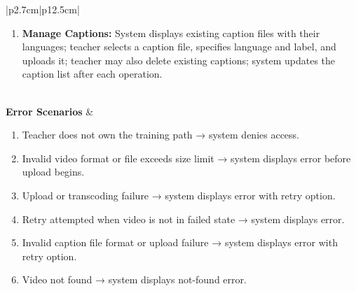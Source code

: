 \begin{table}[H]
\begin{tabular}{|p{2.7cm}|p{12.5cm}|}
\begin{minipage}[t]{\linewidth}
\begin{enumerate}[topsep=0pt,itemsep=1pt,parsep=0pt,partopsep=0pt]
                \item \textbf{Manage Captions:} System displays existing caption files with their languages; teacher selects a caption file, specifies language and label, and uploads it; teacher may also delete existing captions; system updates the caption list after each operation.
            \end{enumerate}
        \end{minipage} \\
        \hline
        \textbf{Error Scenarios} &
        \begin{minipage}[t]{\linewidth}
            \begin{enumerate}[topsep=0pt,itemsep=1pt,parsep=0pt,partopsep=0pt]
                \item Teacher does not own the training path → system denies access.
                \item Invalid video format or file exceeds size limit → system displays error before upload begins.
                \item Upload or transcoding failure → system displays error with retry option.
                \item Retry attempted when video is not in failed state → system displays error.
                \item Invalid caption file format or upload failure → system displays error with retry option.
                \item Video not found → system displays not-found error.
            \end{enumerate}
        \end{minipage} \\
        \hline
    \end{tabular}
    \label{tab:teacher-manage-video}
\end{table}



